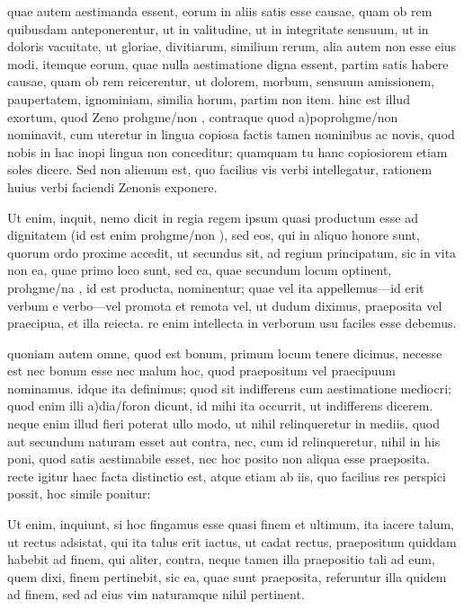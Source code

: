  quae autem aestimanda essent, eorum in aliis satis esse causae, quam ob rem quibusdam anteponerentur, ut in valitudine, ut in integritate sensuum, ut in doloris vacuitate, ut gloriae, divitiarum, similium rerum, alia autem non esse eius modi, itemque eorum, quae nulla aestimatione digna essent, partim satis habere causae, quam ob rem reicerentur, ut dolorem, morbum, sensuum amissionem, paupertatem, ignominiam, similia horum, partim non item. hinc est illud exortum, quod Zeno prohgme/non , contraque quod a)poprohgme/non nominavit, cum uteretur in lingua copiosa factis tamen nominibus ac novis, quod nobis in hac inopi lingua non conceditur; quamquam tu hanc copiosiorem etiam soles dicere. Sed non alienum est, quo facilius vis verbi intellegatur, rationem huius verbi faciendi Zenonis exponere.

 Ut enim, inquit, nemo dicit in regia regem ipsum quasi productum esse ad dignitatem (id est enim prohgme/non ), sed eos, qui in aliquo honore sunt, quorum ordo proxime accedit, ut secundus sit, ad regium principatum, sic in vita non ea, quae primo loco sunt, sed ea, quae secundum locum optinent, prohgme/na , id est producta, nominentur; quae vel ita appellemus—id erit verbum e verbo—vel promota et remota vel, ut dudum diximus, praeposita vel praecipua, et illa reiecta. re enim intellecta in verborum usu faciles esse debemus.

 quoniam autem omne, quod est bonum, primum locum tenere dicimus, necesse est nec bonum esse nec malum hoc, quod praepositum vel praecipuum nominamus. idque ita definimus; quod sit indifferens cum aestimatione mediocri; quod enim illi a)dia/foron dicunt, id mihi ita occurrit, ut indifferens dicerem. neque enim illud fieri poterat ullo modo, ut nihil relinqueretur in mediis, quod aut secundum naturam esset aut contra, nec, cum id relinqueretur, nihil in his poni, quod satis aestimabile esset, nec hoc posito non aliqua esse praeposita. recte igitur haec facta distinctio est, atque etiam ab iis, quo facilius res perspici possit, hoc simile ponitur:

 Ut enim, inquiunt, si hoc fingamus esse quasi finem et ultimum, ita iacere talum, ut rectus adsistat, qui ita talus erit iactus, ut cadat rectus, praepositum quiddam habebit ad finem, qui aliter, contra, neque tamen illa praepositio tali ad eum, quem dixi, finem pertinebit, sic ea, quae sunt praeposita, referuntur illa quidem ad finem, sed ad eius vim naturamque nihil pertinent.

